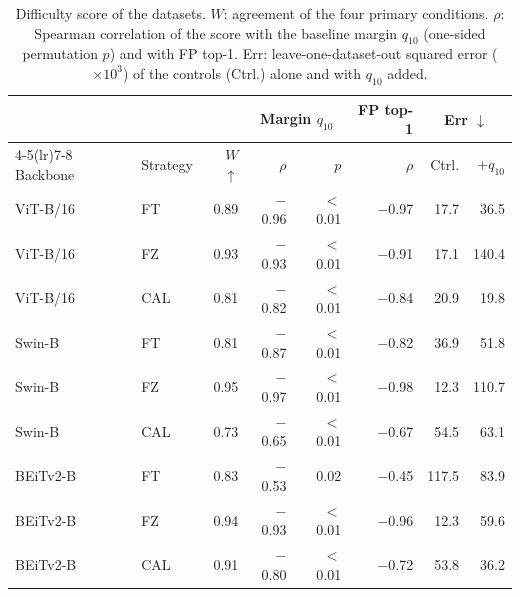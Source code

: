 \begin{table}[t]
\centering
\caption{Difficulty score of the {} datasets. $W$: agreement of the four primary conditions. $\rho$: Spearman correlation of the score with the baseline margin $q_{10}$ (one-sided permutation $p$) and with FP top-1. Err: leave-one-dataset-out squared error ($\times 10^{3}$) of the controls (Ctrl.) alone and with $q_{10}$ added.}
\label{tab:gates}
\setlength{\tabcolsep}{1.8pt}
\small
\begin{tabular}{llrrrrrr}
\toprule
 & & & \multicolumn{2}{c}{Margin $q_{10}$} & FP top-1 & \multicolumn{2}{c}{Err $\downarrow$} \\
\cmidrule(lr){4-5}\cmidrule(lr){7-8}
Backbone & Strategy & $W$ $\uparrow$ & $\rho$ & $p$ & $\rho$ & Ctrl. & +$q_{10}$ \\
\midrule
ViT-B/16 & FT & 0.89 & $-$0.96 & $<$0.01 & $-$0.97 & 17.7 & 36.5 \\
ViT-B/16 & FZ & 0.93 & $-$0.93 & $<$0.01 & $-$0.91 & 17.1 & 140.4 \\
ViT-B/16 & CAL & 0.81 & $-$0.82 & $<$0.01 & $-$0.84 & 20.9 & 19.8 \\
Swin-B & FT & 0.81 & $-$0.87 & $<$0.01 & $-$0.82 & 36.9 & 51.8 \\
Swin-B & FZ & 0.95 & $-$0.97 & $<$0.01 & $-$0.98 & 12.3 & 110.7 \\
Swin-B & CAL & 0.73 & $-$0.65 & $<$0.01 & $-$0.67 & 54.5 & 63.1 \\
BEiTv2-B & FT & 0.83 & $-$0.53 & 0.02 & $-$0.45 & 117.5 & 83.9 \\
BEiTv2-B & FZ & 0.94 & $-$0.93 & $<$0.01 & $-$0.96 & 12.3 & 59.6 \\
BEiTv2-B & CAL & 0.91 & $-$0.80 & $<$0.01 & $-$0.72 & 53.8 & 36.2 \\
\bottomrule
\end{tabular}
\end{table}

